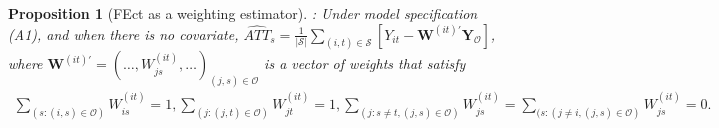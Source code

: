 \documentclass[12pt]{article}
\let\oldcenter\center
\let\oldendcenter\endcenter
\renewenvironment{center}{\setlength\topsep{0pt}\oldcenter}{\oldendcenter}
\newtheorem{proposition}{Proposition}
\begin{document}
\begin{proposition}[FEct as a weighting estimator]: Under model specification (A1), and when there is no covariate,
  \begin{center}
    $\widehat{ATT}_{s} = \frac{1}{|\mathcal{S}|}
                        \sum_{(i,t) \in \mathcal{S}} [Y_{it} - \mathbf{W}^{(it)'} \mathbf{Y}_{\mathcal{O}}]$,
  \end{center} 
  where $\mathbf{W}^{(it)'} = \left(\dots, W_{js}^{(it)}, \dots\right)_{(j,s) \in \mathcal{O}}$ is a vector of weights that satisfy
  \begin{align*}
  \sum_{(s: (i, s)\in\mathcal{O})}W_{is}^{(it)} = 1, \sum_{(j: (j, t)\in\mathcal{O})}W_{jt}^{(it)} = 1, \sum_{(j: s \neq t, (j, s)\in\mathcal{O})}W_{js}^{(it)} = \sum_{(s: (j \neq i, (j, s)\in\mathcal{O})}W_{js}^{(it)} = 0.
  \end{align*}
\end{proposition}
\end{document}
